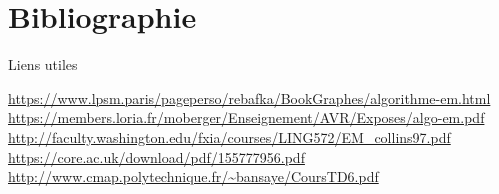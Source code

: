 \documentclass[frenchb]{report}
\newcommand{\1}{\mathbbm{1}}
\theoremstyle{definition}\newtheorem{defn}{Définition}
\theoremstyle{definition}\newtheorem{exm}{Exemple}
\theoremstyle{definition}\newtheorem{nota}{Notation}
\theoremstyle{definition}\newtheorem{rem}{Remarque}
\begin{document}
\chapter*{Bibliographie}
 
Liens utiles

\url{https://www.lpsm.paris/pageperso/rebafka/BookGraphes/algorithme-em.html} \newline
\url{https://members.loria.fr/moberger/Enseignement/AVR/Exposes/algo-em.pdf} \newline
\url{http://faculty.washington.edu/fxia/courses/LING572/EM_collins97.pdf}\newline
\url{https://core.ac.uk/download/pdf/155777956.pdf}\newline
\url{http://www.cmap.polytechnique.fr/~bansaye/CoursTD6.pdf}


\pagebreak
\end{document}
